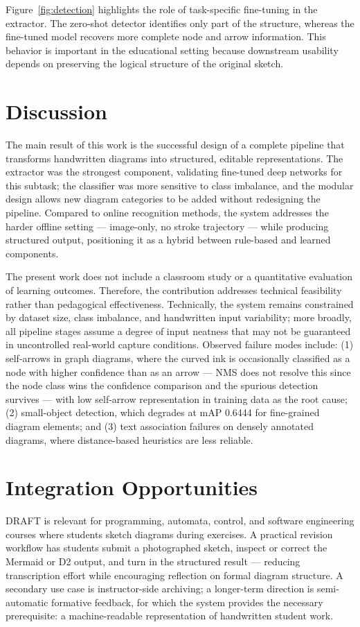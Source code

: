 \documentclass[conference]{IEEEtran}
\begin{document}
Figure~\ref{fig:detection} highlights the role of task-specific fine-tuning in the extractor. The zero-shot detector identifies only part of the structure, whereas the fine-tuned model recovers more complete node and arrow information. This behavior is important in the educational setting because downstream usability depends on preserving the logical structure of the original sketch.

\section{Discussion}
The main result of this work is the successful design of a complete pipeline that transforms handwritten diagrams into structured, editable representations. The extractor was the strongest component, validating fine-tuned deep networks for this subtask; the classifier was more sensitive to class imbalance, and the modular design allows new diagram categories to be added without redesigning the pipeline. Compared to online recognition methods, the system addresses the harder offline setting — image-only, no stroke trajectory — while producing structured output, positioning it as a hybrid between rule-based and learned components.

The present work does not include a classroom study or a quantitative evaluation of learning outcomes. Therefore, the contribution addresses technical feasibility rather than pedagogical effectiveness. Technically, the system remains constrained by dataset size, class imbalance, and handwritten input variability; more broadly, all pipeline stages assume a degree of input neatness that may not be guaranteed in uncontrolled real-world capture conditions. Observed failure modes include: (1) self-arrows in graph diagrams, where the curved ink is occasionally classified as a node with higher confidence than as an arrow — NMS does not resolve this since the node class wins the confidence comparison and the spurious detection survives — with low self-arrow representation in training data as the root cause; (2) small-object detection, which degrades at mAP 0.6444 for fine-grained diagram elements; and (3) text association failures on densely annotated diagrams, where distance-based heuristics are less reliable.

\section{Integration Opportunities}
DRAFT is relevant for programming, automata, control, and software engineering courses where students sketch diagrams during exercises. A practical revision workflow has students submit a photographed sketch, inspect or correct the Mermaid or D2 output, and turn in the structured result — reducing transcription effort while encouraging reflection on formal diagram structure. A secondary use case is instructor-side archiving; a longer-term direction is semi-automatic formative feedback, for which the system provides the necessary prerequisite: a machine-readable representation of handwritten student work.
\end{document}
